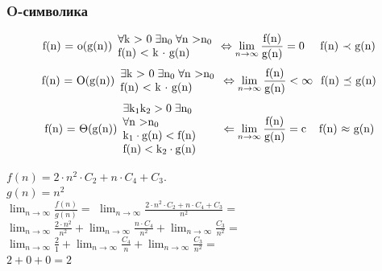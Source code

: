 \documentclass[russian, 12pt]{beamer}
\begin{document}
\begin{frame}
\frametitle{O-символика}
\begin{equation*}
\text{f(n) = o(g(n))}
  \begin{array}{l}
  \forall\text{k > 0}\;\exists\text{n}_0\;  \forall \text{n >}\text{n}_0  \\
  \text{f(n) < k $\cdot$ g(n)}
  \end{array}
\Leftrightarrow
\lim_{n\rightarrow\infty}\frac{\text{f(n)}}{\text{g(n)}}=\text{0}
\hspace{0.49cm}
\text{f(n) $\prec$ g(n)}
\end{equation*}
\vspace{0.3cm}
\begin{equation*}
\text{f(n) = O(g(n))}
  \begin{array}{l}
    \exists\text{k > 0}\;\exists\text{n}_0\;  \forall \text{n >}\text{n}_0  \\
    \text{f(n) < k $\cdot$ g(n)}
  \end{array}
\Leftrightarrow
\lim_{n\rightarrow\infty}\frac{\text{f(n)}}{\text{g(n)}}<\infty
\hspace{0.25cm}
\text{f(n) $\preceq$ g(n)}
\end{equation*}
\vspace{0.3cm}
\begin{equation*}
\text{f(n) = $\Theta$(g(n))}
  \begin{array}{l}
    \exists\text{k}_1\text{k}_2 >\text{0}\;\exists\text{n}_0\hspace{0.5cm}\\
    \forall \text{n >}\text{n}_0\\
    \text{k}_1 \cdot \text{g(n)} < \text{f(n)}\\
    \text{f(n)} < \text{k}_2 \cdot \text{g(n)}
  \end{array}
\hspace{0.2cm}
\Leftarrow
\lim_{n\rightarrow\infty}\frac{\text{f(n)}}{\text{g(n)}}=\text{c}
\hspace{0.4cm}
\text{f(n) $\approx$ g(n)}
\end{equation*}
\end{frame}
\begin{frame}
  $f(n) = 2\cdot n^2 \cdot C_2 + n \cdot C_4 + C_3.$\\[0.1cm]
  $g(n) = n^2$\\[0.2cm]
  $\lim_{n\rightarrow\infty}\frac{f(n)}{g(n)} =$\pause
  $\lim_{n\rightarrow\infty}\frac{2\cdot n^2 \cdot C_2 + 
  n \cdot C_4 + C_3}{n^2}=$\\[0.3cm]\pause
  $\lim_{n\rightarrow\infty}\frac{2\cdot n^2}{n^2}+
  \lim_{n\rightarrow\infty}\frac{n \cdot C_4}{n^2}+
  \lim_{n\rightarrow\infty}\frac{C_3}{n^2}=$\\[0.3cm]\pause
  $\lim_{n\rightarrow\infty}\frac{2}{1}+
  \lim_{n\rightarrow\infty}\frac{C_4}{n}+
  \lim_{n\rightarrow\infty}\frac{C_3}{n^2}=$\\[0.3cm]\pause
  $2 + 0 + 0 = 2$
\end{frame}
\end{document}
